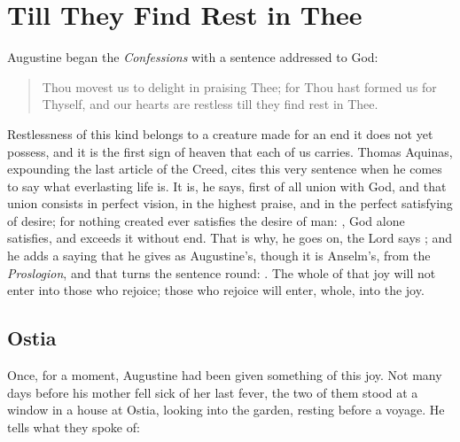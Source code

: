 \section{Till They Find Rest in Thee}

Augustine began the \emph{Confessions} with a sentence addressed to God:

\begin{quote}
Thou movest us to delight in praising Thee; for Thou hast formed us for Thyself, and our hearts are restless till they find rest in Thee.
\end{quote}

Restlessness of this kind belongs to a creature made for an end it does not yet possess, and it is the first sign of heaven that each of us carries. Thomas Aquinas, expounding the last article of the Creed, cites this very sentence when he comes to say what everlasting life is. It is, he says, first of all union with God, and that union consists in perfect vision, in the highest praise, and in the perfect satisfying of desire; for nothing created ever satisfies the desire of man: , God alone satisfies, and exceeds it without end. That is why, he goes on, the Lord says ; and he adds a saying that he gives as Augustine's, though it is Anselm's, from the \emph{Proslogion}, and that turns the sentence round: . The whole of that joy will not enter into those who rejoice; those who rejoice will enter, whole, into the joy.

\subsection{Ostia}

Once, for a moment, Augustine had been given something of this joy. Not many days before his mother fell sick of her last fever, the two of them stood at a window in a house at Ostia, looking into the garden, resting before a voyage. He tells what they spoke of:

